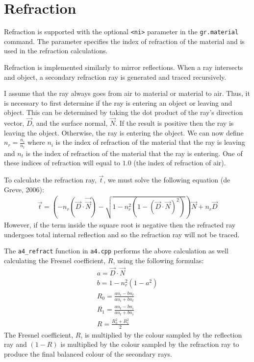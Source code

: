 \section{Refraction}

Refraction is supported with the optional \verb|<ni>| parameter in the
\newline \verb|gr.material| command. The parameter specifies the index 
of refraction of the material and is used in the refraction calculations.

Refraction is implemented similarly to mirror reflections. When a ray intersects
and object, a secondary refraction ray is generated and traced recursively.

I assume that the ray always goes from air to material or material to air. Thus,
it is necessary to first determine if the ray is entering an object or leaving
and object. This can be determined by taking the dot product of the ray's
direction vector, $\vec{D}$,  and the surface normal, $\vec{N}$. If the result 
is positive then the ray is leaving the object. Otherwise, the ray is entering 
the object. We can now define $n_{r} = \frac{n_{i}}{n_{t}}$ where $n_{i}$ is the 
index of refraction of the material that the ray is leaving and $n_{t}$ is the 
index of refraction of the material that the ray is entering. One of these 
indices of refraction will equal to $1.0$ (the index of refraction of air).

To calculate the refraction ray, $\vec{t}$, we must solve the following 
equation (de Greve, 2006):
\begin{equation}
\begin{split}
  \vec{t} = (-n_{r}(\vec{D}\cdot\vec\vec{N}) - \sqrt{1 - n_{r}^2(1 -
  (\vec{D}\cdot\vec{N})^2)})\vec{N} + n_{r}\vec{D}
\end{split}
\end{equation}
However, if the term inside the square root is negative then the refracted ray
undergoes total internal reflection and so the refraction ray will not be
traced.

The \verb|a4_refract| function in \verb|a4.cpp| performs the above calculation
as well calculating the Fresnel coefficient, $R$, using the following formulas:
\begin{equation}
\begin{split}
  a = \vec{D}\cdot\vec{N} \\
  b = 1 - n_{r}^2(1 - a^2) \\
  R_{0} = \frac{an_{i} - bn_{t}}{an_{i} + bn_{t}} \\
  R_{1} = \frac{an_{t} - bn_{i}}{an_{t} + bn_{i}} \\
  R = \frac{R_{0}^2 + R_{1}^2}{2}
\end{split}
\end{equation}
The Fresnel coefficient, $R$, is multiplied by the colour sampled by the
reflection ray and $(1 - R)$ is multiplied by the colour sampled by the
refraction ray to produce the final balanced colour of the secondary rays.

